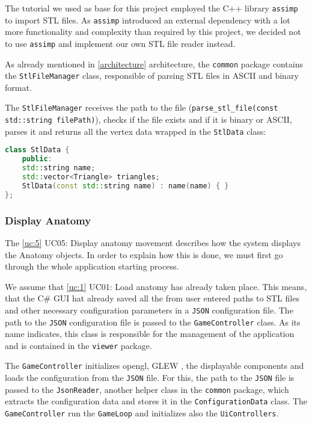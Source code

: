  \label{importing-stl-files}

The tutorial \cite{learnopengl} we used as base for this project employed the C++ library \verb|assimp| \cite{assimp} to import STL files. As \verb|assimp| introduced an external dependency with a lot more functionality and complexity than required by this project, we decided not to use \verb|assimp| and implement our own STL file reader instead. 

As already mentioned in \ref{architecture} architecture, the \verb|common| package contains the \verb|StlFileManager| class, responsible of parsing \gls{STL} files in ASCII and binary format.

The  \verb|StlFileManager| receives the path to the file (\verb|parse_stl_file(const std::string filePath)|), checks if the file exists and if it is binary or ASCII, parses it and returns all the \gls{vertex} data wrapped in the \verb|StlData| class:

\begin{lstlisting}[language=C++, caption=StlData]
class StlData {
	public:
	std::string name;
	std::vector<Triangle> triangles;	
	StlData(const std::string name) : name(name) { }
};
\end{lstlisting}

\subsubsection{Display Anatomy} \label{display-anatomy}

The \ref{uc:5} UC05: Display anatomy movement describes how the system displays the Anatomy objects. In order to explain how this is done, we must first go through the whole application starting process.

We assume that \ref{uc:1} UC01: Load anatomy has already taken place. This means, that the C\# GUI hat already saved all the from user entered paths to STL files and other necessary configuration parameters in a \verb|JSON| configuration file. The path to the \verb|JSON| configuration file is passed to the \verb|GameController| class. As its name indicates, this class is responsible for the management of the application and is contained in the \verb|viewer| package.

The \verb|GameController| initializes \gls{opengl}, GLEW \cite{glew}, the displayable components and loads the configuration from the \verb|JSON| file. For this, the path to the \verb|JSON| file is passed to the \verb|JsonReader|, another helper class in the \verb|common| package, which extracts the configuration data and stores it in the \verb|ConfigurationData| class. The \verb|GameController| run the \verb|GameLoop| and initializes also the \verb|UiControllers|.

